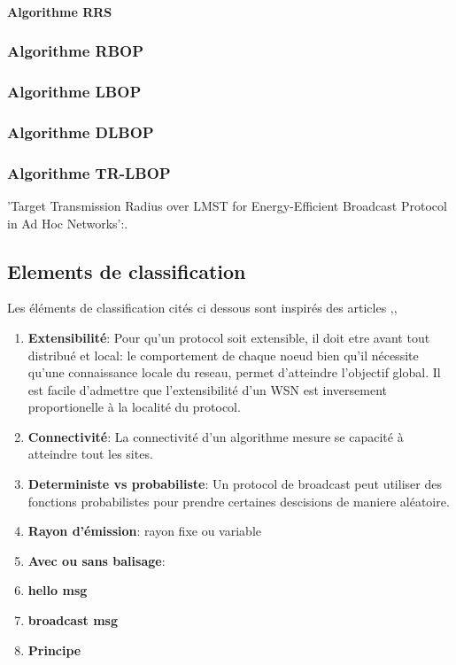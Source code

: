 \paragraph{Algorithme RRS}
\cite{Cartigny2003RNG}





\subsubsection{Algorithme RBOP}
\cite{Cartigny2005}



\subsubsection{Algorithme LBOP}
\cite{Cartigny2005}
\subsubsection{Algorithme DLBOP}
\cite{Cartigny2004}
\subsubsection{Algorithme TR-LBOP}
'Target Transmission Radius over LMST for Energy-Efficient Broadcast Protocol in Ad Hoc Networks':\cite{Ingelrest2004}.\\




\subsection{Elements de classification}
Les éléments de classification cités ci dessous sont inspirés des articles \cite{stojmenovic2004},\cite{ingelrest2005},\cite{wu2003}
\begin{enumerate}
 \item  \textbf{Extensibilité}: Pour qu'un protocol soit extensible, il doit etre avant tout distribué et local: le comportement de chaque noeud bien qu'il
nécessite qu'une connaissance locale du reseau, permet d'atteindre l'objectif global. Il est facile d'admettre que l'extensibilité d'un WSN est inversement proportionelle à la localité du protocol. 
 \item  \textbf{Connectivité}: La connectivité d'un algorithme mesure se capacité à atteindre tout les sites.
 \item  \textbf{Deterministe vs probabiliste}: Un protocol de broadcast peut utiliser des fonctions probabilistes pour prendre certaines descisions de maniere aléatoire.
 \item  \textbf{Rayon d'émission}:  rayon fixe ou variable
 \item  \textbf{Avec ou sans balisage}:  
 \item  \textbf{hello msg} 
 \item  \textbf{broadcast msg} 
 \item  \textbf{Principe} 


 
\end{enumerate}



